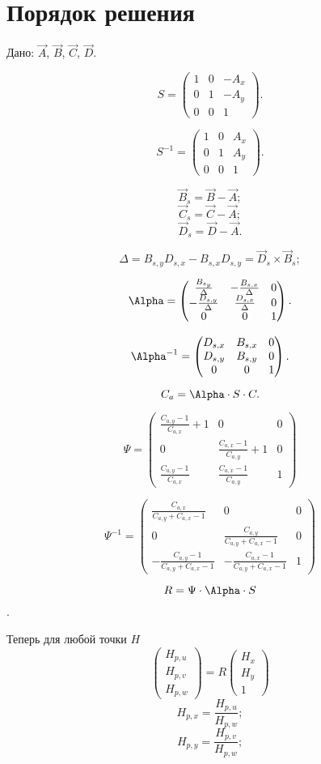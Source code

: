 \section{Порядок решения}

Дано: $\vec A$, $\vec B$, $\vec C$, $\vec D$.

$$S = \begin{pmatrix}
	1 & 0 & -A_x \\
	0 & 1 & -A_y \\
	0 & 0 & 1
\end{pmatrix}.$$

$$S^{-1} = \begin{pmatrix}
	1 & 0 & A_x \\
	0 & 1 & A_y \\
	0 & 0 & 1
\end{pmatrix}.$$

$$\vec B_s = \vec B - \vec A;$$
$$\vec C_s = \vec C - \vec A;$$
$$\vec D_s = \vec D - \vec A.$$

$$ \Delta = B_{s,y} D_{s,x}-B_{s,x} D_{s,y} = \vec D_s \times \vec B_s;$$

$$	\Alpha = 
	\begin{pmatrix}
		\frac{B_{s_y}}{\Delta} & -\frac{B_{s,x}}{\Delta} & 0 \\
		-\frac{D_{s,y}}{\Delta} & \frac{D_{s,x}}{\Delta} & 0 \\
		0 & 0 & 1
	\end{pmatrix}.
$$

$$ \Alpha^{-1} =
\begin{pmatrix}
	D_{s,x} & B_{s,x} & 0 \\
	D_{s,y} & B_{s,y} & 0 \\
	0 & 0 & 1
\end{pmatrix}.
$$

$$C_a = \Alpha \cdot S \cdot C.$$

$$\Psi = 
\begin{pmatrix}
	\frac{C_{a,y}-1}{C_{a,x}} + 1 & 0 & 0 \\
	0 & \frac{C_{a,x}-1}{C_{a,y}}+1 & 0 \\
	\frac{C_{a,y}-1}{C_{a,x}} & \frac{C_{a,x}-1}{C_{a,y}} & 1
\end{pmatrix}
$$

$$\Psi^{-1} =
\begin{pmatrix}
	\frac{C_{a,x}}{C_{a,y}+C_{a,x}-1} & 0 & 0\\
	0 & \frac{C_{a,y}}{C_{a,y}+C_{a,x}-1} & 0\\
	-\frac{C_{a,y}-1}{C_{a,y}+C_{a,x}-1} & -\frac{C_{a,x}-1}{C_{a,y}+C_{a,x}-1} & 1
\end{pmatrix}
$$

$$R = \Psi \cdot \Alpha \cdot S $$.

Теперь для любой точки $H$
$$\begin{pmatrix}
	H_{p,u}\\
	H_{p,v}\\
	H_{p,w}
\end{pmatrix}
= R
\begin{pmatrix}
	H_{x}\\
	H_{y}\\
	1
\end{pmatrix}
$$
$$H_{p,x} = \frac{H_{p,u}}{H_{p,w}};$$
$$H_{p,y} = \frac{H_{p,v}}{H_{p,w}};$$